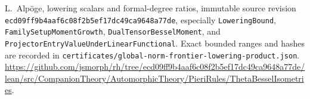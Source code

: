 L.~Alp\"oge, lowering scalars and formal-degree ratios, immutable
source revision
\texttt{ecd09ff9b4aaf6c08f2b5ef17dc49ca9648a77de}, especially
\texttt{LoweringBound}, \texttt{FamilySetupMomentGrowth},
\texttt{DualTensorBesselMoment}, and
\texttt{ProjectorEntryValueUnderLinearFunctional}.
Exact bounded ranges and hashes are recorded in
\texttt{certificates/global-norm-frontier-lowering-product.json}.
\url{https://github.com/jsmorph/rh/tree/ecd09ff9b4aaf6c08f2b5ef17dc49ca9648a77de/lean/src/CompanionTheory/AutomorphicTheory/PieriRules/ThetaBesselIsometries}.
